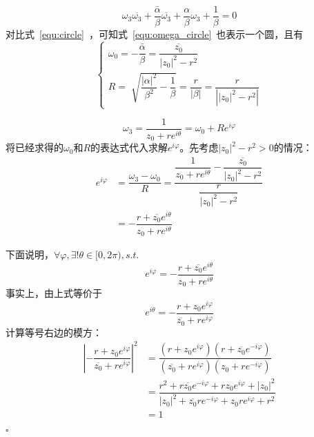 \documentclass{article}
\newenvironment{SOLUTION}[1][{}]{{\noindent\heiti 解#1：}}{\hfill $\square$\par}
\begin{document}
\begin{SOLUTION}
\begin{enumerate}
\begin{equation}
    \omega_3\overline{\omega_3}+\frac{\bar{\alpha}}{\beta}\overline{\omega_3}+\frac{\alpha}{\beta}\omega_3+\frac{1}{\beta}=0
    \label{equ:omega_circle}
    \end{equation}
    对比式~\eqref{equ:circle}~，可知式~\eqref{equ:omega_circle}~也表示一个圆，且有
    \begin{equation}
    \begin{cases}
    \omega_0=-\dfrac{\bar{\alpha}}{\beta}=\dfrac{\overline{z_0}}{|z_0|^2-r^2}\\[3ex]
    R=\sqrt[]{\dfrac{|\alpha|^2}{\beta^2}-\dfrac{1}{\beta}}=\dfrac{r}{|\beta|}=\dfrac{r}{\left||z_0|^2-r^2\right|}
    \end{cases}
    \end{equation}
    
    \begin{equation}
    \omega_3=\dfrac{1}{z_0+re^{i\theta}}=\omega_0+Re^{i\varphi}
    \end{equation}
    将已经求得的$\omega_0$和$R$的表达式代入求解$e^{i\varphi}$。先考虑$|z_0|^2-r^2>0$的情况：
    \begin{equation}
    \begin{split}
    e^{i\varphi}&=\dfrac{\omega_3-\omega_0}{R}=\dfrac{\dfrac{1}{z_0+re^{i\theta}}-\dfrac{\overline{z_0}}{|z_0|^2-r^2}}{\dfrac{r}{|z_0|^2-r^2}}\\[2ex]
    &=-\dfrac{r+\overline{z_0}e^{i\theta}}{z_0+re^{i\theta}}
    \end{split}
    \label{equ:varphi}
    \end{equation}
 
 
    下面说明，$\forall \varphi,\exists !\theta\in[0,2\pi), s.t.$
    \begin{equation*}
    e^{i\varphi}=-\dfrac{r+\overline{z_0}e^{i\theta}}{z_0+re^{i\theta}}
    \end{equation*}
    事实上，由上式等价于
    \begin{equation}
    e^{i\theta}=-\dfrac{r+z_0e^{i\varphi}}{\overline{z_0}+re^{i\varphi}}
    \label{equ:theta}
    \end{equation}
    计算等号右边的模方：
    \begin{equation}
    \begin{split}
    \left|
    -\dfrac{r+z_0e^{i\varphi}}{\overline{z_0}+re^{i\varphi}}\right|^2&=\dfrac{(r+z_0e^{i\varphi})(r+\overline{z_0}e^{-i\varphi})}{(\overline{z_0}+re^{i\varphi})(z_0+re^{-i\varphi})}\\
    &=\dfrac{r^2+r\overline{z_0}e^{-i\varphi}+rz_0e^{i\varphi}+|z_0|^2}{|z_0|^2+\overline{z_0}re^{-i\varphi}+z_0re^{i\varphi}+r^2}\\
    &=1
    \end{split}
    \end{equation}
    

\end{enumerate}
\end{SOLUTION}
\end{document}
